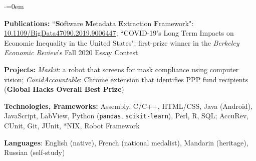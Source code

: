 \begin{list}{$\cdot$}{\leftmargin=0em} %
   \item \textbf{Publications:} ``\textbf{So}ftware \textbf{M}etadata \textbf{E}xtraction \textbf{F}ramework": \href{https://doi.org/10.1109/BigData47090.2019.9006447}{10.1109/BigData47090.2019.9006447}; ``COVID-19’s Long Term Impacts on Economic Inequality in the United States": first-prize winner in the \textit{Berkeley Economic Review}'s Fall 2020 Essay Contest
   \item \textbf{Projects:} \textit{Maskit}: a robot that screens for mask compliance using computer vision; \textit{CovidAccountable}: Chrome extension that identifies \href{https://web.archive.org/web/20200903224716/https://www.sba.gov/funding-programs/loans/coronavirus-relief-options/paycheck-protection-program}{PPP} fund recipients (\textbf{Global Hacks Overall Best Prize})%
   \item \textbf{Technologies, Frameworks:} Assembly, C/C++, HTML/CSS, Java (Android), JavaScript, LabView, Python (\texttt{pandas}, \texttt{scikit-learn}), Perl, R, SQL; AccuRev, CUnit, Git, JUnit, *NIX, Robot Framework
   \item \textbf{Languages}: English (native), French (national medalist), Mandarin (heritage), Russian (self-study)
\end{list}
